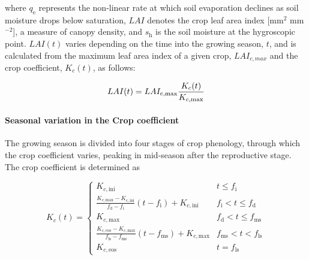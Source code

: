 \noindent
where $q_{\text{e}}$ represents the non-linear rate at which soil evaporation declines as soil moisture drops below saturation, $LAI$ denotes the crop leaf area index [mm$^2$ mm$^{-2}$], a measure of canopy density, and $s_{\text{h}}$ is the soil moisture at the hygroscopic point. $LAI(t)$ varies depending on the time into the growing season, $t$, and is calculated from the maximum leaf area index of a given crop, $LAI_{c,max}$ and the crop coefficient, $K_c(t)$, as follows:

\begin{equation}
\label{eq:lai}
    LAI(t) = LAI_{\text{c,\text{max}}} \frac{K_c(t)}{K_{c, \text{max}}}
\end{equation}

\noindent

\paragraph{Seasonal variation in the Crop coefficient}
The growing season is divided into four stages of crop phenology, through which the crop coefficient varies, peaking in mid-season after the reproductive stage. The crop coefficient is determined as

\begin{equation}
\label{eq:Kc}
    K_c(t) = \begin{cases}
        K_{c,\text{ini}}
            &   t \leq f_\text{i} \\[6pt]
            
        \frac{K_{c,\text{max}}-K_{c,\text{ini}}}{f_\text{d} - f_\text{i}} (t- f_\text{i}) + K_{c,\text{ini}}
            &   f_\text{i} < t \leq f_\text{d}   \\[6pt]
            
        K_{c,\text{max}}
            &   f_\text{d}  < t \leq f_\text{ms}   \\[6pt]
            
        \frac{K_{c, \text{eos}}-K_{c,\text{max}}} {f_\text{ls} - f_\text{ms}}  (t- f_\text{ms}) + K_{c,\text{max}}
            &   f_\text{ms} < t < f_\text{ls}  \\[6pt]

        K_{c,\text{eos}}
            &   t = f_\text{ls}
    \end{cases}
\end{equation}

